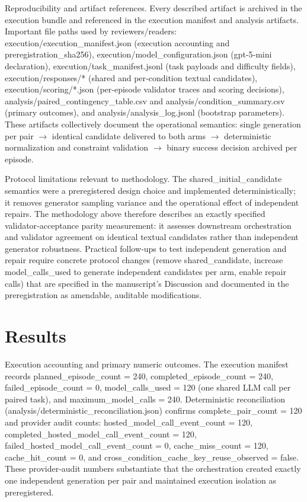 \documentclass[conference]{IEEEtran}
\begin{document}
Reproducibility and artifact references. Every described artifact is archived in the execution bundle and referenced in the execution manifest and analysis artifacts. Important file paths used by reviewers/readers: execution/execution\_manifest.json (execution accounting and preregistration\_sha256), execution/model\_configuration.json (gpt‑5‑mini declaration), execution/task\_manifest.jsonl (task payloads and difficulty fields), execution/responses/* (shared and per‑condition textual candidates), execution/scoring/*.json (per‑episode validator traces and scoring decisions), analysis/paired\_contingency\_table.csv and analysis/condition\_summary.csv (primary outcomes), and analysis/analysis\_log.jsonl (bootstrap parameters). These artifacts collectively document the operational semantics: single generation per pair \ensuremath{\rightarrow} identical candidate delivered to both arms \ensuremath{\rightarrow} deterministic normalization and constraint validation \ensuremath{\rightarrow} binary success decision archived per episode.

Protocol limitations relevant to methodology. The shared\_initial\_candidate semantics were a preregistered design choice and implemented deterministically; it removes generator sampling variance and the operational effect of independent repairs. The methodology above therefore describes an exactly specified validator‑acceptance parity measurement: it assesses downstream orchestration and validator agreement on identical textual candidates rather than independent generator robustness. Practical follow‑ups to test independent generation and repair require concrete protocol changes (remove shared\_candidate, increase model\_calls\_used to generate independent candidates per arm, enable repair calls) that are specified in the manuscript's Discussion and documented in the preregistration as amendable, auditable modifications.

\section{Results}
Execution accounting and primary numeric outcomes. The execution manifest records planned\_episode\_count = 240, completed\_episode\_count = 240, failed\_episode\_count = 0, model\_calls\_used = 120 (one shared LLM call per paired task), and maximum\_model\_calls = 240. Deterministic reconciliation (analysis/deterministic\_reconciliation.json) confirms complete\_pair\_count = 120 and provider audit counts: hosted\_model\_call\_event\_count = 120, completed\_hosted\_model\_call\_event\_count = 120, failed\_hosted\_model\_call\_event\_count = 0, cache\_miss\_count = 120, cache\_hit\_count = 0, and cross\_condition\_cache\_key\_reuse\_observed = false. These provider‑audit numbers substantiate that the orchestration created exactly one independent generation per pair and maintained execution isolation as preregistered.
\end{document}
